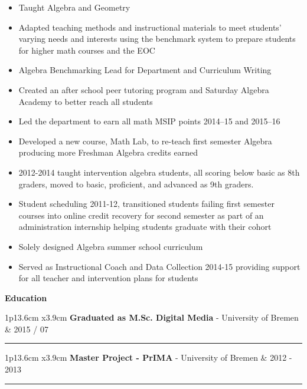 \documentclass[10pt,A4]{article}
\newcommand{\cvsection}[1]
{
	\begin{center}
		\large\textcolor{sectcol}{\textbf{#1}}
	\end{center}
}
\newcommand{\cvevent}[5]
{

\begin{tabular*}{1\textwidth}{p{13.6cm}  x{3.9cm}}
	\textbf{#2} - \textcolor{bgcol}{#3} &   \vspace{1.5pt}\textcolor{sectcol}{#1}
\end{tabular*}

\vspace{-8pt}
\textcolor{softcol}{\hrule}
\vspace{6pt}


}
\begin{document}
\begin{itemize}
	\item Taught Algebra and Geometry
	\item Adapted teaching methods and instructional materials to meet students' varying needs and interests using the benchmark system to prepare students for higher math courses and the EOC
	\item Algebra Benchmarking Lead for Department and Curriculum Writing
	\item Created an after school peer tutoring program and Saturday Algebra Academy to better reach all students
	\item Led the department to earn all math MSIP points 2014--15 and 2015--16
	\item Developed a new course, Math Lab, to re-teach first semester Algebra producing more Freshman Algebra credits earned
	\item 2012-2014 taught intervention algebra students, all scoring below basic as 8th graders, moved to basic, proficient, and advanced as 9th graders. 
	\item Student scheduling 2011-12, transitioned students failing first semester courses into online credit recovery for second semester as part of an administration internship helping students graduate with their cohort
	\item Solely designed Algebra summer school curriculum
	\item Served as Instructional Coach and Data Collection 2014-15 providing support for all teacher and intervention plans for students
\end{itemize}


\cvsection{Education}

\cvevent{2015 / 07}{Graduated as M.Sc. Digital Media}{University of Bremen}{Master Thesis: Semi Automated Scoring in Technology Based Assessment}{Developed and evaluated an algorithm for semi automated scoring of spreadsheet data}


%
\cvevent{2012 - 2013}{Master Project - PrIMA}{University of Bremen}{Co-Invented a touch table application for medical support, co-developed software (Java) }{Formed a scrum team, mainted project dev server (Debian), surveyed target audience}
\end{document}
